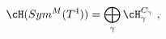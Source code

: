 \begin{equation}
 \cH (Sym^M (T^4)) = \bigoplus_{\gamma} \cH_{\gamma}^{C_{\gamma}}~,
\end{equation}

